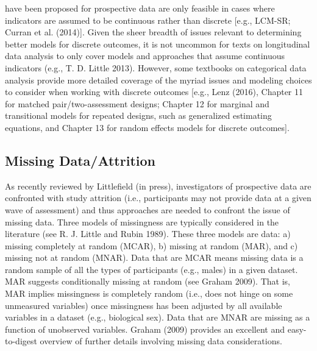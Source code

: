 \documentclass[
  letterpaper,
  DIV=11,
  numbers=noendperiod]{scrartcl}
\begin{document}
have been proposed for prospective data are only feasible in cases where
indicators are assumed to be continuous rather than discrete {[}e.g.,
LCM-SR; Curran et al. (2014){]}. Given the sheer breadth of issues
relevant to determining better models for discrete outcomes, it is not
uncommon for texts on longitudinal data analysis to only cover models
and approaches that assume continuous indicators (e.g., T. D. Little
2013). However, some textbooks on categorical data analysis provide more
detailed coverage of the myriad issues and modeling choices to consider
when working with discrete outcomes {[}e.g., Lenz (2016), Chapter 11 for
matched pair/two-assessment designs; Chapter 12 for marginal and
transitional models for repeated designs, such as generalized estimating
equations, and Chapter 13 for random effects models for discrete
outcomes{]}.

\hypertarget{missing-dataattrition}{%
\subsection{Missing Data/Attrition}\label{missing-dataattrition}}

As recently reviewed by Littlefield (in press), investigators of
prospective data are confronted with study attrition (i.e., participants
may not provide data at a given wave of assessment) and thus approaches
are needed to confront the issue of missing data. Three models of
missingness are typically considered in the literature (see R. J. Little
and Rubin 1989). These three models are data: a) missing completely at
random (MCAR), b) missing at random (MAR), and c) missing not at random
(MNAR). Data that are MCAR means missing data is a random sample of all
the types of participants (e.g., males) in a given dataset. MAR suggests
conditionally missing at random (see Graham 2009). That is, MAR implies
missingness is completely random (i.e., does not hinge on some
unmeasured variables) once missingness has been adjusted by all
available variables in a dataset (e.g., biological sex). Data that are
MNAR are missing as a function of unobserved variables. Graham (2009)
provides an excellent and easy-to-digest overview of further details
involving missing data considerations.
\end{document}
